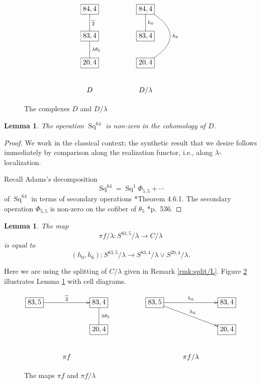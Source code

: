 \documentclass{amsart}
\newtheorem{lemma}[thm]{Lemma}
\theoremstyle{definition}
\newcommand{\map}{\rightarrow}
\newcommand{\Xonefour}{C}
\newcommand{\hsf}{\widetilde{2}}
\DeclareMathOperator{\Sq}{Sq}
\begin{document}
\begin{figure}[h!]
\caption{The complexes $D$ and $D/\lambda$ \label{fig:D}}
\[
\xymatrix{
*+[F]{84,4} \ar@{-}[d]^-{\hsf} && *+[F]{84,4} \ar@{-}[d]^-{h_0} \ar@{-}@/_-35pt/[dd]^-{h_6}\\
*+[F]{83,4} \ar@{-}[d]^-{\lambda \theta_5} && *+[F]{83,4} \\
 *+[F]{20,4} &&  *+[F]{20,4} \\
 D && D/\lambda \\
}
\]
\end{figure}

\begin{lemma}
\label{lem:Sq64}
The operation $\Sq^{64}$ is non-zero in the cohomology of $D$.
\end{lemma}

\begin{proof}
We work in the classical context; the synthetic result that we desire
follows immediately by comparison along the realization functor, i.e.,
along $\lambda$-localization.

Recall Adams's decomposition 
$$\Sq^{64} = \Sq^1 \Phi_{5,5} + \cdots$$
of $\Sq^{64}$ 
in terms of secondary operations \cite{Adams60}*{Theorem 4.6.1}.
The secondary operation $\Phi_{5,5}$
is non-zero on the cofiber of $\theta_5$ \cite{BJM}*{p.\ 536}.
\end{proof}

\begin{lemma}
\label{lem:pi-f/L}
The map
$$ \pi f /\lambda: 
S^{83,5}/\lambda \map \Xonefour /\lambda$$
is equal to
$$(h_0, h_6): S^{83,5}/\lambda \map  S^{83,4}/\lambda \vee S^{20,4}/\lambda.$$
\end{lemma}

Here we are using the splitting of $\Xonefour/\lambda$ given in Remark \ref{rmk:split/L}.
Figure \ref{fig:pi-f} illustrates Lemma \ref{lem:pi-f/L} with
cell diagrams.

\begin{figure}[h!]
\caption{The maps $\pi f$ and $\pi f / \lambda$ \label{fig:pi-f}}
\[
\xymatrix{
*+[F]{83,5} \ar[rr]^-{\hsf} && *+[F]{83,4} \ar@{-}[d]^-{\lambda \theta_5} && *+[F]{83,5} \ar[rr]^-{h_0} \ar[rrd]^-{h_6}  && *+[F]{83,4} \\
 && *+[F]{20,4} && && *+[F]{20,4} \\
 & \pi f & && & \pi f / \lambda
}
\]
\end{figure}
\end{document}
